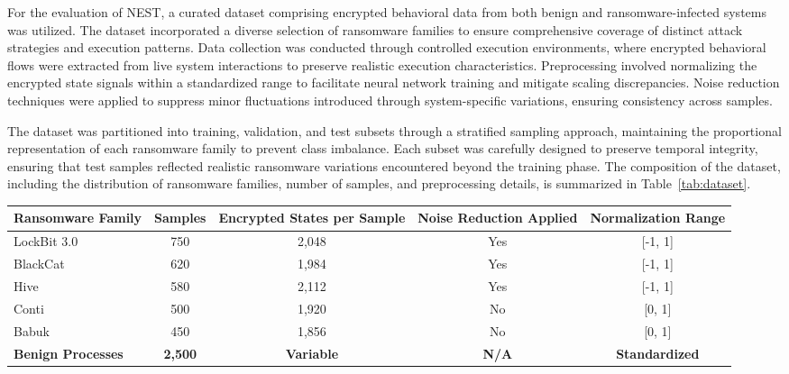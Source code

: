 \documentclass[lettersize,journal]{IEEEtran}
\begin{document}
For the evaluation of NEST, a curated dataset comprising encrypted behavioral data from both benign and ransomware-infected systems was utilized. The dataset incorporated a diverse selection of ransomware families to ensure comprehensive coverage of distinct attack strategies and execution patterns. Data collection was conducted through controlled execution environments, where encrypted behavioral flows were extracted from live system interactions to preserve realistic execution characteristics. Preprocessing involved normalizing the encrypted state signals within a standardized range to facilitate neural network training and mitigate scaling discrepancies. Noise reduction techniques were applied to suppress minor fluctuations introduced through system-specific variations, ensuring consistency across samples.

The dataset was partitioned into training, validation, and test subsets through a stratified sampling approach, maintaining the proportional representation of each ransomware family to prevent class imbalance. Each subset was carefully designed to preserve temporal integrity, ensuring that test samples reflected realistic ransomware variations encountered beyond the training phase. The composition of the dataset, including the distribution of ransomware families, number of samples, and preprocessing details, is summarized in Table~\ref{tab:dataset}. 

\begin{table*}[h]
	\centering
	\caption{Composition and preprocessing details of the dataset used for NEST evaluation.}
	\label{tab:dataset}
		\begin{tabular}{|l|c|c|c|c|}
			\hline
			\textbf{Ransomware Family} & \textbf{Samples} & \textbf{Encrypted States per Sample} & \textbf{Noise Reduction Applied} & \textbf{Normalization Range} \\ 
			\hline
			LockBit 3.0 & 750 & 2,048 & Yes & [-1, 1] \\ 
			
			BlackCat & 620 & 1,984 & Yes & [-1, 1] \\ 
			
			Hive & 580 & 2,112 & Yes & [-1, 1] \\ 
			
			Conti & 500 & 1,920 & No & [0, 1] \\ 
			
			Babuk & 450 & 1,856 & No & [0, 1] \\ 
			
			\textbf{Benign Processes} & \textbf{2,500} & \textbf{Variable} & \textbf{N/A} & \textbf{Standardized} \\ 
			\hline
		\end{tabular}%
\end{table*}
\end{document}
